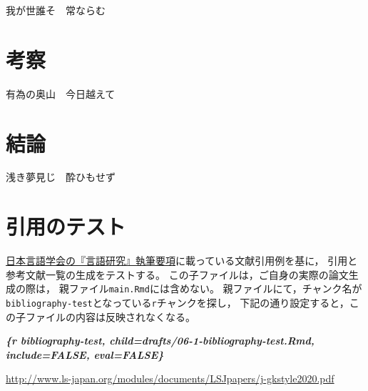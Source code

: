\documentclass[
  pandoc,
  jafont = haranoaji,
  a4paper,
  everyparhook = compat,
  japaram = {units = true}]{bxjsarticle}
\newenvironment{Shaded}{\begin{snugshade}}{\end{snugshade}}
\newcommand{\InformationTok}[1]{\textcolor[rgb]{0.00,0.40,1.00}{\textbf{\textit{#1}}}}
\begin{document}
我が世誰そ　常ならむ

\hypertarget{ux8003ux5bdf}{%
\section{考察}\label{ux8003ux5bdf}}

有為の奥山　今日越えて

\hypertarget{ux7d50ux8ad6}{%
\section{結論}\label{ux7d50ux8ad6}}

浅き夢見じ　酔ひもせず

\hypertarget{ux5f15ux7528ux306eux30c6ux30b9ux30c8}{%
\section{引用のテスト}\label{ux5f15ux7528ux306eux30c6ux30b9ux30c8}}

\href{http://www.ls-japan.org/modules/documents/LSJpapers/j-gkstyle2020.pdf}{日本言語学会の『言語研究』執筆要項}に載っている文献引用例を基に，
引用と参考文献一覧の生成をテストする。
この子ファイルは，ご自身の実際の論文生成の際は，
親ファイル\texttt{main.Rmd}には含めない。
親ファイルにて，チャンク名が\texttt{bibliography-test}となっている\texttt{r}チャンクを探し，
下記の通り設定すると，この子ファイルの内容は反映されなくなる。

\begin{Shaded}
\begin{Highlighting}[]
\InformationTok{\textasciigrave{}\textasciigrave{}\textasciigrave{}\{r bibliography{-}test, child=\textquotesingle{}drafts/06{-}1{-}bibliography{-}test.Rmd\textquotesingle{}, include=FALSE, eval=FALSE\}}
\InformationTok{\textasciigrave{}\textasciigrave{}\textasciigrave{}}
\end{Highlighting}
\end{Shaded}

\url{http://www.ls-japan.org/modules/documents/LSJpapers/j-gkstyle2020.pdf}

\citet{佐久間1941}

\citet{服部1976}

\citet{金田一1955}

\citet{上野1997}

\citet{柴谷1978}

\citet{林_南1974}

\citet{梶1992}

\citet{橋本1966}
\end{document}

